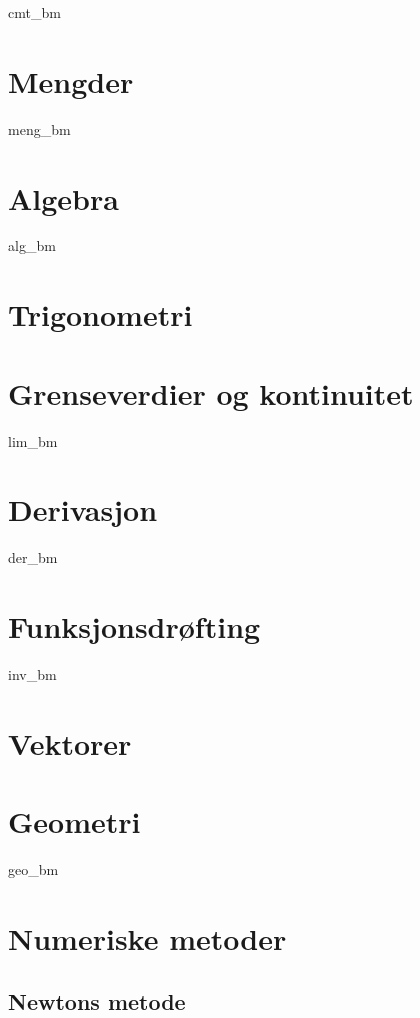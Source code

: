 



\addto\captionsenglish{\renewcommand{\contentsname}{Innhold}}


	
	{\footnotesize \tableofcontents}
	\newpage
	
	{cmt_bm}
	
	\chapter{Mengder}
	{meng_bm}
	
	\chapter{Algebra}
	{alg_bm}
	
	\chapter{Trigonometri}	
	
	\chapter{Grenseverdier og kontinuitet}
	{lim_bm}
	
	\chapter{Derivasjon}
	{der_bm}
	
	\chapter{Funksjonsdrøfting}
	{inv_bm}
	
	\chapter{Vektorer}
	
	\chapter{Geometri}
	{geo_bm}

	\chapter{Numeriske metoder}
	\section{Newtons metode}
